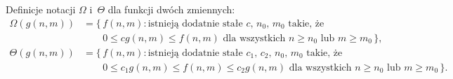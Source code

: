 \exercise %

\noindent Definicje notacji $\Omega$ i~$\Theta$ dla funkcji dwóch zmiennych:
\[
	\begin{split}
		\Omega(g(n,m)) &= \bigl\{\,f(n,m):\text{istnieją dodatnie stałe $c$, $n_0$, $m_0$ takie, że} \\
		&\qquad 0 \le cg(n,m) \le f(n,m) \text{ dla wszystkich $n \ge n_0$ lub $m \ge m_0$}\,\bigr\}, \\[2mm]
		\Theta(g(n,m)) &= \bigl\{\,f(n,m):\text{istnieją dodatnie stałe $c_1$, $c_2$, $n_0$, $m_0$ takie, że} \\
		&\qquad 0 \le c_1g(n,m) \le f(n,m) \le c_2g(n,m) \text{ dla wszystkich $n \ge n_0$ lub $m \ge m_0$}\,\bigr\}.
	\end{split}
\]

